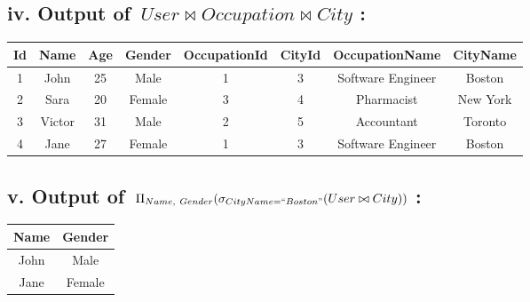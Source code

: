 \documentclass[12pt]{article}
\begin{document}
\subsection*{iv. Output of \,$User \bowtie Occupation \bowtie City$ :}
\begin{table}[!hbt]
    \centering
    \begin{tabular}{|c|c|c|c|c|c|c|c|}
        \hline
        \textbf{Id} &
        \textbf{Name} &
        \textbf{Age} &
        \textbf{Gender} &
        \textbf{OccupationId} &
        \textbf{CityId} &
        \textbf{OccupationName} &
        \textbf{CityName}\\
        \hline
        1 & 
        John &
        25 &
        Male &
        1 &
        3 &
        Software Engineer &
        Boston\\
        \hline
        2 & 
        Sara &
        20 &
        Female &
        3 &
        4 &
        Pharmacist &
        New York\\
        \hline
        3 & 
        Victor &
        31 &
        Male &
        2 &
        5 &
        Accountant &
        Toronto\\
        \hline
        4 & 
        Jane &
        27 &
        Female &
        1 &
        3 &
        Software Engineer &
        Boston\\
        \hline
        \end{tabular}
    \label{tab:my_label}
\end{table}

\subsection*{v. Output of \,$\Pi_{Name,~Gender}(\sigma_{CityName=``Boston"}(User\bowtie City))$ :}
\begin{table}[!hbt]
    \centering
    \begin{tabular}{|c|c|}
        \hline
        \textbf{Name} &
        \textbf{Gender}\\
        \hline
        John &
        Male\\
        \hline
        Jane &
        Female\\
        \hline
        \end{tabular}
    \label{tab:my_label}
\end{table}

\newpage
\end{document}
